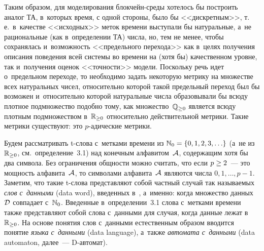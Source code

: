 \begin{multicols}{2}
Таким образом, для моделирования блок\-чейн-сре\-ды хотелось бы построить 
аналог ТА, в~которых время,
с одной стороны, было бы <<дискретным>>, т.\,е.\  в~качестве <<исходных>> 
меток времени выступали
бы натуральные,  а~не рациональные (как в~определении ТА) числа, но, тем не
менее, чтобы сохранялась и~возможность <<предельного перехода>>  как в~целях получения описания поведения всей системы во времени на (хотя бы) качественном
уровне, так и~получения оценок  <<точности>> модели.  Поскольку
речь идет о~предельном переходе, то необходимо задать некоторую
метрику на множестве всех натуральных чисел, относительно которой такой предельный
переход был бы возможен и~относительно которой натуральные числа образовывали
бы всюду плотное подмножество подобно тому, как множество~$\mathbb{Q}_{\ge 0}$ является
всюду плотным подмножеством в~$\mathbb{R}_{\ge 0}$ относительно действительной мет\-ри\-ки.
Такие метрики существуют: это $p$-ади\-че\-ские мет\-рики.

Будем рассматривать t-сло\-ва  с~метками
времени из $\N_0\hm=\{0,1,2,3,\ldots\}$ (а~не из~$\mathbb{R}_{\ge 0}$, см.\
 определение~3.1) над конечным
алфавитом~$\mathcal A$, содержащим хотя бы два символа.
Без ограничения общности можно считать, что
если $p\hm\ge 2$~---  это мощность алфавита~$\mathcal A$, то  символами алфавита~$\mathcal A$ 
являются числа $0,1,\ldots,p-1$.
Заметим, что такие  t-сло\-ва  пред\-став\-ля\-ют
собой част\-ный случай так на\-зы\-ва\-емых \textit{слов с~данными} (data word), введенных 
в~\cite{Bouyer-Algebraic-Time}, а~именно: когда множество данных~$\mathcal D$
совпадает с~$\mathbb N_0$. Введенные в~определении~3.1
слова с~метками времени также пред\-став\-ля\-ют собой слова с~данными для случая,
когда данные лежат в~$\mathbb{R}_{\ge 0}$. На основе понятия слов  с~данными 
 естественным
образом вводится понятие \textit{языка с~данными} (data language), 
а~также \textit{автомата с~данными} (data automaton, далее~--- D-ав\-томат).
\smallskip


\end{multicols}
